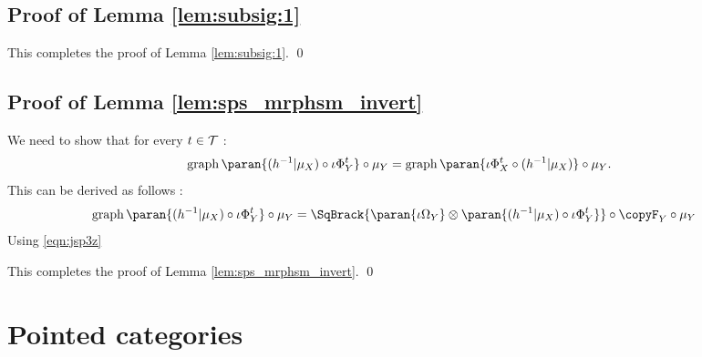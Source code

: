 \documentclass[12pt,oneside,pb-diagram]{article}
\DeclareMathOperator{\graph}{graph}
\begin{document}
\subsection{Proof of Lemma \ref{lem:subsig:1}} \label{sec:proof:subsig:1}

This completes the proof of Lemma \ref{lem:subsig:1}. \qed
\subsection{Proof of Lemma \ref{lem:sps_mrphsm_invert}} \label{sec:proof:sps_mrphsm_invert}

We need to show that for every $t\in \mathcal{T}$ :
%
\[ \graph\paran{ (h^{-1}|\mu_X) \circ \iota \Phi^t_Y } \circ \mu_Y = \graph\paran{ \iota \Phi_X^t \circ (h^{-1}|\mu_X) } \circ \mu_Y . \]
%
This can be derived as follows :
%
\[\begin{split}
	& \graph\paran{ (h^{-1}|\mu_X) \circ \iota \Phi^t_Y } \circ \mu_Y = \SqBrack{ \paran{\iota\Omega_Y} \otimes \paran{ (h^{-1}|\mu_X) \circ \iota \Phi^t_Y } } \circ \copyF_Y \circ \mu_Y
\end{split}\]
%
Using \eqref{eqn:jsp3z} 

This completes the proof of Lemma \ref{lem:sps_mrphsm_invert}. \qed 

\section{Pointed categories} \label{sec:app:pointed}

\end{document}

